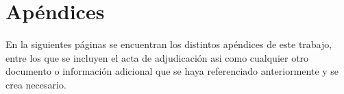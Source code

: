 \chapter{Apéndices}\label{apendices}

En la siguientes páginas se encuentran los distintos apéndices de este trabajo, entre los que se incluyen el acta de adjudicación asi como cualquier otro documento o información adicional que se haya referenciado anteriormente y se crea necesario.

